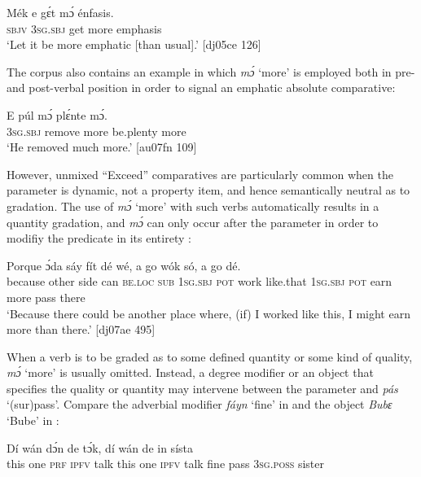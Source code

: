 \ea%
    \label{ex:key:474}
    \gll Mék    e    gɛ́t  mɔ́    énfasis.\\
\textsc{sbjv}    \textsc{3sg.sbj}  get  more  emphasis\\

\glt ‘Let it be more emphatic [than usual].’ [dj05ce 126]
\z

The corpus also contains an example in which \textit{mɔ́} ‘more’ is employed both in pre- and post-verbal position in order to signal an emphatic absolute comparative:


\ea%
    \label{ex:key:475}
    \gll E    púl    mɔ́    plɛ́nte    mɔ́.\\
\textsc{3sg.sbj}  remove  more  be.plenty  more\\

\glt ‘He removed much more.’ [au07fn 109]
\z

However, unmixed “Exceed” comparatives are particularly common when the parameter is dynamic, not a property item, and hence semantically neutral as to gradation. The use of \textit{mɔ́} ‘more’ with such verbs automatically results in a quantity gradation, and \textit{mɔ́} can only occur after the parameter in order to modifiy the predicate in its entirety :


\ea%
    \label{ex:key:476}
    \gll Porque  ɔ́da    sáy  fít  dé    wé,  a    go  wók    só,
a    go            dé.\\
because  other  side  can  \textsc{be.loc}  \textsc{sub}  \textsc{1sg.sbj}  \textsc{pot}  work  like.that
\textsc{1sg.sbj}  \textsc{pot}  earn    more  pass    there\\

\glt ‘Because there could be another place where, (if) I worked like this,
I might earn more than there.’ [dj07ae 495]
\z

When a verb is to be graded as to some defined quantity or some kind of quality, \textit{mɔ́} ‘more’ is usually omitted. Instead, a degree modifier or an object that specifies the quality or quantity may intervene between the parameter and \textit{pás} ‘(sur)pass’. Compare the adverbial modifier \textit{fáyn} ‘fine’ in  and the object \textit{Bubɛ} ‘Bube’ in :


\ea%
    \label{ex:key:477}
    \gll Dí  wán  dɔ́n  de  tɔ́k,  dí  wán  de      
   in    sísta\\
this  one  \textsc{prf}  \textsc{ipfv}  talk  this  one  \textsc{ipfv}  talk  fine  
pass    \textsc{3sg.poss}  sister\\

